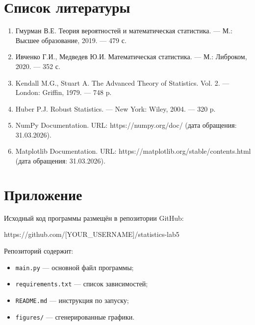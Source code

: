\documentclass[12pt, a4paper]{article}
\begin{document}
\section{Список литературы}

\begin{enumerate}
    \item Гмурман В.Е. Теория вероятностей и математическая статистика. — М.: Высшее образование, 2019. — 479 с.
    
    \item Ивченко Г.И., Медведев Ю.И. Математическая статистика. — М.: Либроком, 2020. — 352 с.
    
    \item Kendall M.G., Stuart A. The Advanced Theory of Statistics. Vol. 2. — London: Griffin, 1979. — 748 p.
    
    \item Huber P.J. Robust Statistics. — New York: Wiley, 2004. — 320 p.
    
    \item NumPy Documentation. URL: https://numpy.org/doc/ (дата обращения: 31.03.2026).
    
    \item Matplotlib Documentation. URL: https://matplotlib.org/stable/contents.html (дата обращения: 31.03.2026).
\end{enumerate}

\section{Приложение}

Исходный код программы размещён в репозитории GitHub:

\begin{center}
https://github.com/[YOUR\_USERNAME]/statistics-lab5
\end{center}

Репозиторий содержит:
\begin{itemize}
    \item \texttt{main.py} — основной файл программы;
    \item \texttt{requirements.txt} — список зависимостей;
    \item \texttt{README.md} — инструкция по запуску;
    \item \texttt{figures/} — сгенерированные графики.
\end{itemize}
\end{document}
